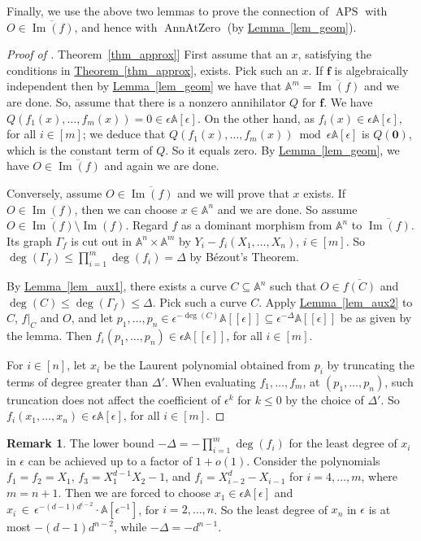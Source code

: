 \documentclass[11pt]{article}
\numberwithin{equation}{section}
\theoremstyle{definition}
\newtheorem{remark}[theorem]{Remark}
\theoremstyle{plain}
\newcommand{\expref}[2]{\hyperref[#2]{#1~\ref{#2}}}
\newcommand{\aff}{\mathbb{A}}
\DeclareMathOperator{\im}{\mathrm{Im}}
\DeclareMathOperator{\APS}{\mathrm{APS}\xspace} %
\DeclareMathOperator{\AnnAtZero}{\mathrm{AnnAtZero}\xspace} %
\begin{document}
Finally, we use the above two lemmas to prove the connection of $\APS$ with $O\in \overline{\im(f)}$, and hence with $\AnnAtZero$ (by \expref{Lemma}{lem_geom}).

\begin{proof}[Proof of \expref{Theorem}{thm_approx}]
First assume that an $x$, satisfying the conditions in \expref{Theorem}{thm_approx}, exists. Pick such an $x$. If $\mathbf f$
%
is  %
algebraically independent then by \expref{Lemma}{lem_geom} we have that $\aff^m=\overline{\im(f)}$ and we are done. So, assume that there is a nonzero annihilator $Q$ for $\mathbf f$.
We have $Q(f_1(x),\dots,f_m(x))=0\in\epsilon \aff[\epsilon]$. On the other hand, as $f_i(x)\in \epsilon \aff[\epsilon]$, for all $i\in [m]$; we deduce that $Q(f_1(x),\dots,f_m(x))\bmod \epsilon \aff[\epsilon]$ is $Q(\mathbf 0)$, which is the constant term of $Q$. So it equals zero. By \expref{Lemma}{lem_geom}, we have $O\in \overline{\im(f)}$ and again we are done.

Conversely, assume $O\in \overline{\im(f)}$ and we will prove that $x$ exists.
If $O\in \im(f)$, then we can choose $x\in \aff^n$ and we are done. So assume $O\in  \overline{\im(f)}\setminus \im(f)$.
Regard $f$ as a dominant morphism from $\aff^n$ to $\overline{\im(f)}$. Its graph $\Gamma_f$ is cut out in $\aff^n\times \aff^m$ by $Y_i-f_i(X_1,\dots,X_n)$, $i\in[m]$. So $\deg(\Gamma_f)\leq \prod_{i=1}^m \deg(f_i) = \Delta$ by B\'ezout's Theorem.

By \expref{Lemma}{lem_aux1}, there exists a curve $C\subseteq \aff^n$ such that $O\in \overline{f(C)}$ and $\deg(C)\leq \deg(\Gamma_f)\leq \Delta$. Pick such a curve $C$. Apply \expref{Lemma}{lem_aux2} to $C$, $f|_C$ and $O$, and let $p_1,\dots,p_n\in \epsilon^{-\deg(C)} \aff[[\epsilon]]\subseteq \epsilon^{-\Delta} \aff[[\epsilon]]$ be as given by the lemma.
Then $f_i(p_1,\dots,p_n)\in \epsilon \aff[[\epsilon]]$, for all $i\in [m]$. 

For $i\in [n]$, let $x_i$ be the Laurent polynomial obtained from $p_i$ by truncating the terms of degree greater than $\Delta'$.
When evaluating $f_1,\dots,f_m$, at $(p_1,\dots,p_n)$, such truncation does not affect the coefficient of $\epsilon^k$ for $k\leq 0$ by the choice of $\Delta'$.
So $f_i(x_1,\dots,x_n)\in \epsilon \aff[\epsilon]$,  for all $i\in [m]$.
\end{proof}

\noindent

%
\begin{remark}   %
The lower bound $-\Delta=-\prod_{i=1}^m \deg(f_i)$ for the least degree of $x_i$ in $\epsilon$ can be achieved up to a  factor of $1+o(1)$. Consider the polynomials $f_1=f_2=X_1$, $f_3=X_1^{d-1}X_2-1$, and $f_i=X_{i-2}^d-X_{i-1}$ for $i=4,\dots,m$, where $m=n+1$. Then we are forced to choose $x_1\in  \epsilon \aff[\epsilon]$ and $x_i \,\in\, \epsilon^{-(d-1)d^{i-2}}\cdot\aff[\epsilon^{-1}] $, for $i=2,\dots, n$. So the least degree of $x_n$ in $\epsilon$  is at most $-(d-1)d^{n-2}$, while $-\Delta=-d^{n-1}$.
\end{remark}
\end{document}
